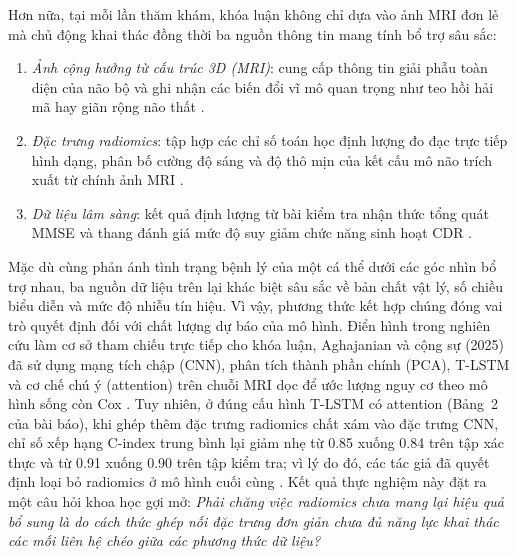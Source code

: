 Hơn nữa, tại mỗi lần thăm khám, khóa luận không chỉ dựa vào ảnh MRI đơn lẻ mà chủ động khai thác đồng thời ba nguồn thông tin mang tính bổ trợ sâu sắc:
\begin{enumerate}
\item \emph{Ảnh cộng hưởng từ cấu trúc 3D (MRI)}: cung cấp thông tin giải phẫu toàn diện của não bộ và ghi nhận các biến đổi vĩ mô quan trọng như teo hồi hải mã hay giãn rộng não thất \cite{weiner2015impact}.
\item \emph{Đặc trưng radiomics}: tập hợp các chỉ số toán học định lượng đo đạc trực tiếp hình dạng, phân bố cường độ sáng và độ thô mịn của kết cấu mô não trích xuất từ chính ảnh MRI \cite{vangriethuysen2017computational}.
\item \emph{Dữ liệu lâm sàng}: kết quả định lượng từ bài kiểm tra nhận thức tổng quát MMSE và thang đánh giá mức độ suy giảm chức năng sinh hoạt CDR \cite{folstein1975mmse,morris1993cdr}.
\end{enumerate}

Mặc dù cùng phản ánh tình trạng bệnh lý của một cá thể dưới các góc nhìn bổ trợ nhau, ba nguồn dữ liệu trên lại khác biệt sâu sắc về bản chất vật lý, số chiều biểu diễn và mức độ nhiễu tín hiệu. Vì vậy, phương thức kết hợp chúng đóng vai trò quyết định đối với chất lượng dự báo của mô hình. Điển hình trong nghiên cứu làm cơ sở tham chiếu trực tiếp cho khóa luận, Aghajanian và cộng sự (2025) đã sử dụng mạng tích chập (CNN), phân tích thành phần chính (PCA), T-LSTM và cơ chế chú ý (attention) trên chuỗi MRI dọc để ước lượng nguy cơ theo mô hình sống còn Cox \cite{aghajanian2025longitudinal}. Tuy nhiên, ở đúng cấu hình T-LSTM có attention (Bảng~2 của bài báo), khi ghép thêm đặc trưng radiomics chất xám vào đặc trưng CNN, chỉ số xếp hạng C-index trung bình lại giảm nhẹ từ 0.85 xuống 0.84 trên tập xác thực và từ 0.91 xuống 0.90 trên tập kiểm tra; vì lý do đó, các tác giả đã quyết định loại bỏ radiomics ở mô hình cuối cùng \cite{aghajanian2025longitudinal}. Kết quả thực nghiệm này đặt ra một câu hỏi khoa học gợi mở: \emph{Phải chăng việc radiomics chưa mang lại hiệu quả bổ sung là do cách thức ghép nối đặc trưng đơn giản chưa đủ năng lực khai thác các mối liên hệ chéo giữa các phương thức dữ liệu?}

